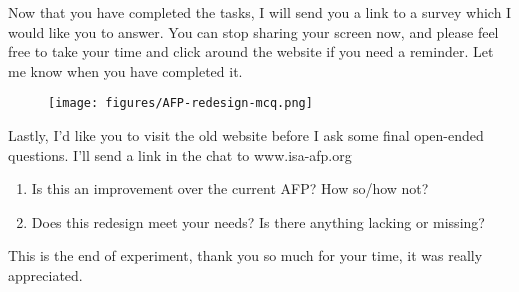 \documentclass[bsc,frontabs,oneside,singlespacing,parskip,deptreport,logo]{infthesis}
\begin{document}
Now that you have completed the tasks, I will send you a link to a survey which I would like you to answer. You can stop sharing your screen now, and please feel free to take your time and click around the website if you need a reminder. Let me know when you have completed it.   

\begin{figure}[h]
    \centering
    \texttt{[image: figures/AFP-redesign-mcq.png]}
\end{figure}

Lastly, I’d like you to visit the old website before I ask some final open-ended questions. I’ll send a link in the chat to www.isa-afp.org  

\begin{enumerate}
    \item Is this an improvement over the current AFP? How so/how not?
    \item Does this redesign meet your needs? Is there anything lacking or missing? 
\end{enumerate}

This is the end of experiment, thank you so much for your time, it was really appreciated.
\end{document}
